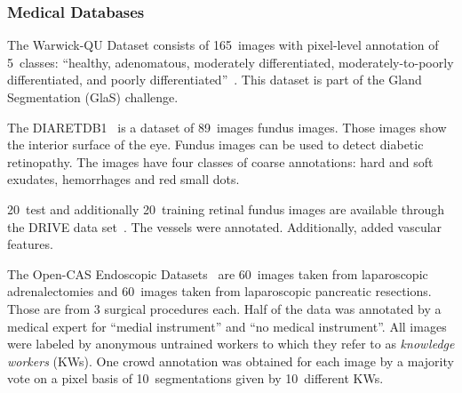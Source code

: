 \subsubsection{Medical Databases}

The Warwick-QU Dataset consists of 165~images with pixel-level annotation of
5~classes: \enquote{healthy, adenomatous, moderately differentiated,
moderately-to-poorly differentiated, and poorly
differentiated}~\cite{coelho2009nuclear}. This dataset is part of the
Gland Segmentation (GlaS) challenge.

The DIARETDB1~\cite{kalesnykiene2014diaretdb1} is a dataset of 89~images fundus
images. Those images show the interior surface of the eye. Fundus images can
be used to detect diabetic retinopathy. The images have four classes of coarse
annotations: hard and soft exudates, hemorrhages and red small dots.

20~test and additionally 20~training retinal fundus images are available
through the DRIVE data set~\cite{staal2004ridge}. The vessels were annotated.
Additionally, \cite{azzopardi2011detection} added vascular features.

The Open-CAS Endoscopic Datasets~\cite{maier2014can} are 60~images taken from
laparoscopic adrenalectomies and 60~images taken from laparoscopic pancreatic
resections. Those are from 3 surgical procedures each. Half of the data was
annotated by a medical expert for \enquote{medial instrument} and \enquote{no
medical instrument}. All images were labeled by anonymous untrained workers to
which they refer to as \textit{knowledge workers} (KWs). One crowd annotation
was obtained for each image by a majority vote on a pixel basis of
10~segmentations given by 10~different KWs.